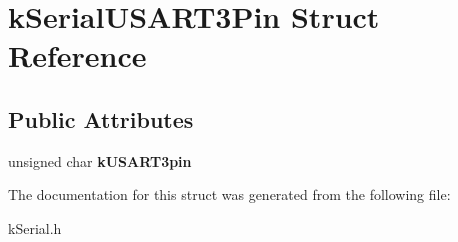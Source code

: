 \hypertarget{structkSerialUSART3Pin}{}\section{k\+Serial\+U\+S\+A\+R\+T3\+Pin Struct Reference}
\label{structkSerialUSART3Pin}
\subsection*{Public Attributes}
\begin{DoxyCompactItemize}
\item 
unsigned char {\bfseries k\+U\+S\+A\+R\+T3pin}\hypertarget{structkSerialUSART3Pin_ab956753f65bd2e59fd1ff0017c65c781}{}\label{structkSerialUSART3Pin_ab956753f65bd2e59fd1ff0017c65c781}

\end{DoxyCompactItemize}


The documentation for this struct was generated from the following file\+:\begin{DoxyCompactItemize}
\item 
k\+Serial.\+h\end{DoxyCompactItemize}
